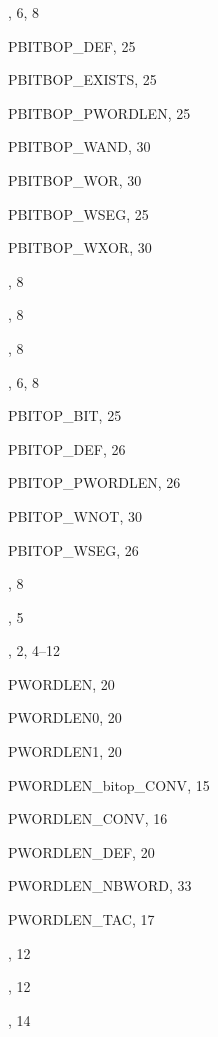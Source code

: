 \begin{theindex}
  \indexspace

  \item {}, 6, 8
  \item {\ptt PBITBOP\_DEF}, 25
  \item {\ptt PBITBOP\_EXISTS}, 25
  \item {\ptt PBITBOP\_PWORDLEN}, 25
  \item {\ptt PBITBOP\_WAND}, 30
  \item {\ptt PBITBOP\_WOR}, 30
  \item {\ptt PBITBOP\_WSEG}, 25
  \item {\ptt PBITBOP\_WXOR}, 30
  \item {}, 8
  \item {}, 8
  \item {}, 8
  \item {}, 6, 8
  \item {\ptt PBITOP\_BIT}, 25
  \item {\ptt PBITOP\_DEF}, 26
  \item {\ptt PBITOP\_PWORDLEN}, 26
  \item {\ptt PBITOP\_WNOT}, 30
  \item {\ptt PBITOP\_WSEG}, 26
  \item {}, 8
  \item {}, 5
  \item {}, 2, 4--12
  \item {\ptt PWORDLEN}, 20
  \item {\ptt PWORDLEN0}, 20
  \item {\ptt PWORDLEN1}, 20
  \item {\ptt PWORDLEN\_bitop\_CONV}, 15
  \item {\ptt PWORDLEN\_CONV}, 16
  \item {\ptt PWORDLEN\_DEF}, 20
  \item {\ptt PWORDLEN\_NBWORD}, 33
  \item {\ptt PWORDLEN\_TAC}, 17
  \item {}, 12
  \item {}, 12

  \indexspace

  \item {}, 14

  \indexspace


\end{theindex}
